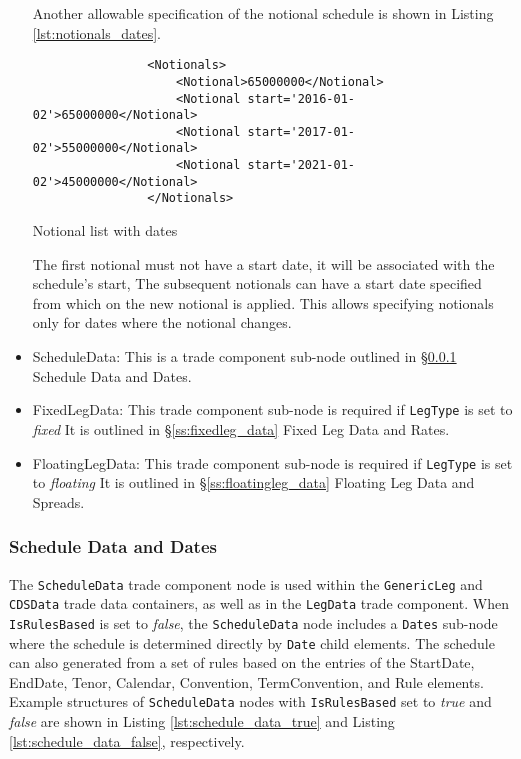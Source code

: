 \begin{itemize}
Another allowable specification of the notional schedule is shown in Listing \ref{lst:notionals_dates}. 
\begin{listing}[H]
\begin{verbatim}
                <Notionals>
                    <Notional>65000000</Notional>
                    <Notional start='2016-01-02'>65000000</Notional>
                    <Notional start='2017-01-02'>55000000</Notional>
                    <Notional start='2021-01-02'>45000000</Notional>
                </Notionals>
\end{verbatim}
\caption{Notional list with dates}
\label{lst:notionals_dates}
\end{listing}
The first notional must not have a start date, it will be associated
with the schedule's start, The subsequent notionals can have a start
date specified from which on the new notional is applied. This allows
specifying notionals only for dates where the notional changes.

\item ScheduleData: This is a trade component sub-node outlined in \S \ref{ss:schedule_data} Schedule Data and Dates.  
\item FixedLegData: This trade component sub-node is required if \lstinline!LegType! is set to \emph{fixed} It is outlined in \S \ref{ss:fixedleg_data} Fixed Leg Data and Rates. 
\item FloatingLegData: This trade component sub-node is required if \lstinline!LegType! is set to \emph{floating} It is outlined in \S \ref{ss:floatingleg_data} Floating Leg Data and Spreads.
\end{itemize}

\subsubsection{Schedule Data and Dates}\label{ss:schedule_data}

The \lstinline!ScheduleData! trade component node is used within the
\lstinline!GenericLeg! and \lstinline!CDSData! trade data containers,
as well as in the \lstinline!LegData! trade component. When
\lstinline!IsRulesBased! is set to \emph{false}, the
\lstinline!ScheduleData! node includes a \lstinline!Dates! sub-node
where the schedule is determined directly by  \lstinline!Date! child
elements. The schedule can also generated from a set of rules based on the entries of the StartDate, EndDate, Tenor, Calendar,  Convention, TermConvention, and  Rule elements.
Example structures of  \lstinline!ScheduleData! nodes with \lstinline!IsRulesBased! set to \emph{true} and \emph{false} are shown in Listing \ref{lst:schedule_data_true} and Listing \ref{lst:schedule_data_false}, respectively.

